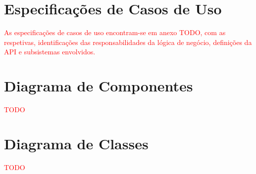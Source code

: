 \documentclass[a4paper,12pt]{scrreprt}
\begin{document}

\chapter{Especificações de Casos de Uso}
\vspace{1cm}

\textcolor{red}{As especificações de casos de uso encontram-se em anexo TODO, com as respetivas,
identificações das responsabilidades da lógica de negócio, definições da API e
subsistemas envolvidos.}



\chapter{Diagrama de Componentes}
\vspace{1cm}

\textcolor{red}{TODO}



\chapter{Diagrama de Classes}
\vspace{1cm}

\textcolor{red}{TODO}


\end{document}

